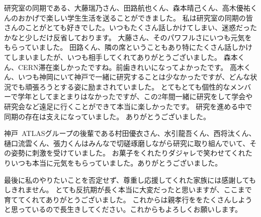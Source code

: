 研究室の同期である、大藤瑞乃さん、田路航也くん、森本晴己くん、高木優祐くんのおかげで楽しい学生生活を送ることができました。
私は研究室の同期の皆さんのことがとても好きでした。いつもたくさん話しかけてしまい、迷惑だったかなと少しだけ反省しております。
大藤さん、そのパワフルさにいつも元気をもらっていました。
田路くん、隣の席ということもあり特にたくさん話しかけてしまいましたが、いつも相手してくれてありがとうございました。
森本くん、CERN滞在楽しかったですね。前歯きれいになってよかったです。
高木くん、いつも神岡にいて神戸で一緒に研究することは少なかったですが、どんな状況でも頑張ろうとする姿に励まされていました。
とてもとても個性的なメンバーで学年としてまとまりはなかったですが、この2年間一緒に研究をして学会や研究会など遠足に行くことができて本当に楽しかったです。
研究を進める中で同期の存在は支えになっていました。
ありがとうございました。

神戸~ATLASグループの後輩である村田優衣さん、水引龍吾くん、西将汰くん、樋口流雲くん、張力くんはみんなで切磋琢磨しながら研究に取り組んでいて、その姿勢に刺激を受けていました。
お菓子をくれたりダジャレで笑わせてくれたりいつも本当に元気をもらっていました。ありがとうございました。

最後に私のやりたいことを否定せず、尊重し応援してくれた家族には感謝してもしきれません。
とても反抗期が長く本当に大変だったと思いますが、ここまで育ててくれてありがとうございました。
これからは親孝行ををたくさんしようと思っているので長生きしてください。これからもよろしくお願いします。